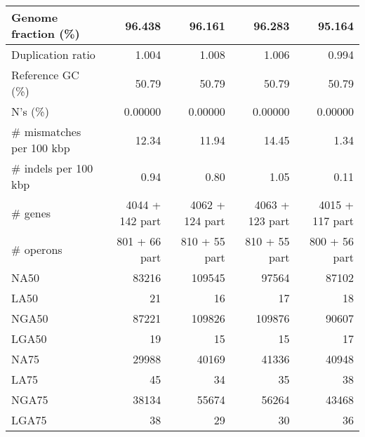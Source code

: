 \begin{table}[ht]
\begin{center}
\begin{tabular}{|l*{4}{|r}|}
Genome fraction (\%) & 96.438 & 96.161 & 96.283 & 95.164 \\ \hline
Duplication ratio & 1.004 & 1.008 & 1.006 & 0.994 \\ \hline
Reference GC (\%) & 50.79 & 50.79 & 50.79 & 50.79 \\ \hline
N's (\%) & 0.00000 & 0.00000 & 0.00000 & 0.00000 \\ \hline
\# mismatches per 100 kbp & 12.34 & 11.94 & 14.45 & 1.34 \\ \hline
\# indels per 100 kbp & 0.94 & 0.80 & 1.05 & 0.11 \\ \hline
\# genes & 4044 + 142 part & 4062 + 124 part & 4063 + 123 part & 4015 + 117 part \\ \hline
\# operons & 801 + 66 part & 810 + 55 part & 810 + 55 part & 800 + 56 part \\ \hline
NA50 & 83216 & 109545 & 97564 & 87102 \\ \hline
LA50 & 21 & 16 & 17 & 18 \\ \hline
NGA50 & 87221 & 109826 & 109876 & 90607 \\ \hline
LGA50 & 19 & 15 & 15 & 17 \\ \hline
NA75 & 29988 & 40169 & 41336 & 40948 \\ \hline
LA75 & 45 & 34 & 35 & 38 \\ \hline
NGA75 & 38134 & 55674 & 56264 & 43468 \\ \hline
LGA75 & 38 & 29 & 30 & 36 \\ \hline
\end{tabular}
\end{center}
\end{table}

